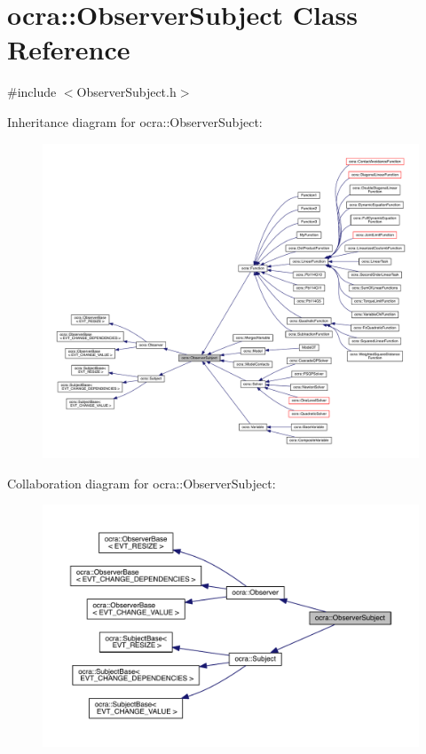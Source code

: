 \hypertarget{classocra_1_1ObserverSubject}{}\section{ocra\+:\+:Observer\+Subject Class Reference}
\label{classocra_1_1ObserverSubject}


{\ttfamily \#include $<$Observer\+Subject.\+h$>$}



Inheritance diagram for ocra\+:\+:Observer\+Subject\+:
\nopagebreak
\begin{figure}[H]
\begin{center}
\leavevmode
\includegraphics[width=350pt]{d5/d60/classocra_1_1ObserverSubject__inherit__graph}
\end{center}
\end{figure}


Collaboration diagram for ocra\+:\+:Observer\+Subject\+:
\nopagebreak
\begin{figure}[H]
\begin{center}
\leavevmode
\includegraphics[width=350pt]{d5/de8/classocra_1_1ObserverSubject__coll__graph}
\end{center}
\end{figure}
